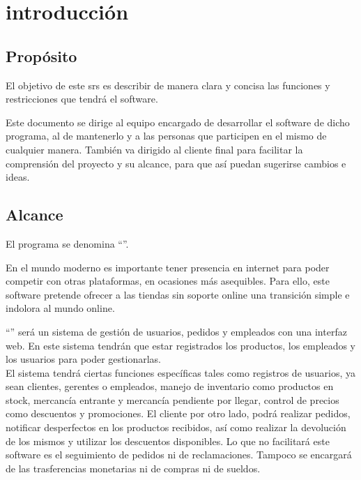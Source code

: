 \section{introducción}
\subsection{Propósito}
El objetivo de este \gls{srs} es describir de manera clara y concisa las funciones y restricciones que tendrá el software.

Este documento se dirige al equipo encargado de desarrollar el software de dicho programa, al de mantenerlo y a las personas que participen en el mismo de cualquier manera. También va dirigido al cliente final para facilitar la comprensión del proyecto y su alcance, para que así puedan sugerirse cambios e ideas.
\subsection{Alcance}
El programa se denomina ``\nombredelproyecto''.

En el mundo moderno es importante tener presencia en internet para poder competir con otras plataformas, en ocasiones más asequibles. Para ello, este software pretende ofrecer a las tiendas sin soporte online una transición simple e indolora al mundo online.

``\nombredelproyecto'' será un sistema de gestión de usuarios, pedidos y empleados con una interfaz web. En este sistema tendrán que estar registrados los productos, los empleados y los usuarios para poder gestionarlas.\\
El sistema tendrá ciertas funciones específicas tales como registros de usuarios, ya sean clientes, gerentes o empleados, manejo de inventario como productos en stock, mercancía entrante y mercancía pendiente por llegar, control de precios como descuentos y promociones. El cliente por otro lado, podrá realizar pedidos, notificar desperfectos en los productos recibidos, así como realizar la devolución de los mismos y utilizar los descuentos disponibles.
Lo que no facilitará este software es el seguimiento de pedidos ni de reclamaciones. Tampoco se encargará de las trasferencias monetarias ni de compras ni de sueldos.

\glsaddall
\nocite{*}
{
    \printglossary[title=Definiciones\, acrónimos y abreviaturas, numberedsection]}





